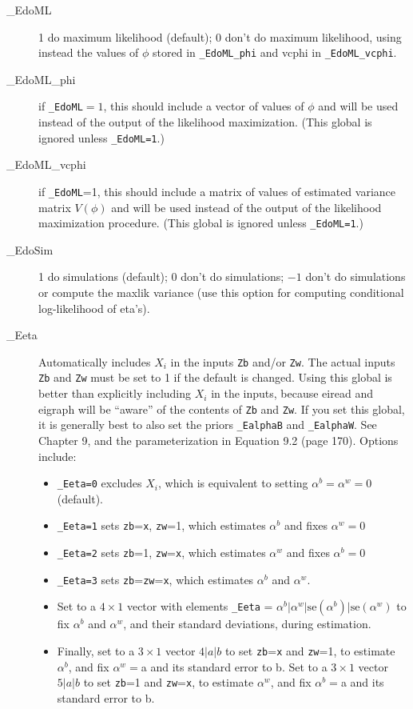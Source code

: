 \documentclass[11pt,titlepage]{article}
\begin{document}
\begin{description}
\item[\_EdoML] 1 do maximum likelihood (default); 0 don't do maximum
  likelihood, using instead the values of $\phi$ stored in
  \texttt{\_EdoML\_phi} and vcphi in \texttt{\_EdoML\_vcphi}.

\item[\_EdoML\_phi] if \texttt{\_EdoML}$=1$, this should include a
  vector of values of $\phi$ and will be used instead of the output of
  the likelihood maximization.  (This global is ignored unless
  \texttt{\_EdoML=1}.)

\item[\_EdoML\_vcphi] if \texttt{\_EdoML}=1, this should include a
  matrix of values of estimated variance matrix $V(\phi)$ and will be
  used instead of the output of the likelihood maximization procedure.
  (This global is ignored unless \texttt{\_EdoML=1}.)

\item[\_EdoSim] 1 do simulations (default); 0 don't do simulations;
  $-1$ don't do simulations or compute the maxlik variance (use this
  option for computing conditional log-likelihood of eta's).

\item[\_Eeta] Automatically includes $X_i$ in the inputs \texttt{Zb}
  and/or \texttt{Zw}.  The actual inputs \texttt{Zb} and \texttt{Zw}
  must be set to 1 if the default is changed.  Using this global is
  better than explicitly including $X_i$ in the inputs, because eiread
  and eigraph will be ``aware'' of the contents of \texttt{Zb} and
  \texttt{Zw}.  If you set this global, it is generally best to also
  set the priors \texttt{\_EalphaB} and \texttt{\_EalphaW}.  See
  Chapter 9, and the parameterization in Equation 9.2 (page 170).
  Options include:
  \begin{itemize}
  \item \texttt{\_Eeta=0} excludes $X_i$, which is equivalent
    to setting $\alpha^b=\alpha^w=0$ (default).
  \item \texttt{\_Eeta=1} sets \texttt{zb}=\texttt{x}, \texttt{zw}=1,
    which estimates $\alpha^b$ and fixes $\alpha^w=0$
  \item \texttt{\_Eeta=2} sets \texttt{zb}=1, \texttt{zw}=\texttt{x},
    which estimates $\alpha^w$ and fixes $\alpha^b=0$
  \item \texttt{\_Eeta=3} sets \texttt{zb}=\texttt{zw}=\texttt{x},
    which estimates $\alpha^b$ and $\alpha^w$.
  \item Set to a $4\times 1$ vector with elements \texttt{\_Eeta} =
    $\alpha^b\vert\alpha^w\vert\text{se}(\alpha^b)\vert\text{se}(\alpha^w)$
    to fix $\alpha^b$ and $\alpha^w$, and their standard deviations,
    during estimation.
  \item Finally, set to a $3\times 1$ vector $4|a|b$ to set
    \texttt{zb}=\texttt{x} and \texttt{zw}=1, to estimate $\alpha^b$,
    and fix $\alpha^w=$a and its standard error to b. Set to a
    $3\times 1$ vector $5|a|b$ to set \texttt{zb}=1 and
    \texttt{zw}=\texttt{x}, to estimate $\alpha^w$, and fix
    $\alpha^b=$a and its standard error to b.
  \end{itemize}
  

\end{description}
\end{document}
